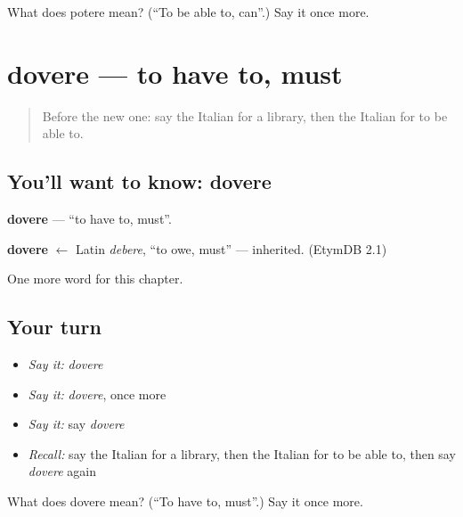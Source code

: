 \begin{tcolorbox}[breakable,colback=teal!4,colframe=teal!35!black,title={Before you move on}]
What does potere mean? (\textquotedblleft{}To be able to, can\textquotedblright{}.) Say it once more.
\end{tcolorbox}
\section[dovere]{dovere — to have to, must}

\label{lesson:IT-C85-dovere}



\begin{quote}
Before the new one: say the Italian for a library, then the Italian for to be able to.
\end{quote}

\subsection*{You'll want to know: dovere}
\textbf{dovere} — \textquotedblleft{}to have to, must\textquotedblright{}.

\begin{cousinweb}
\textbf{dovere} $\leftarrow$ Latin \emph{debere}, \textquotedblleft{}to owe, must\textquotedblright{} — inherited. (EtymDB 2.1)
\end{cousinweb}

\begin{grammarlens}[title={What you've built}]
One more word for this chapter.
\end{grammarlens}

\subsection*{Your turn}
\begin{itemize}
\raggedright
  \item \emph{Say it:} \emph{dovere}
  \item \emph{Say it:} \emph{dovere}, once more
  \item \emph{Say it:} say \emph{dovere}
  \item \emph{Recall:} say the Italian for a library, then the Italian for to be able to, then say \emph{dovere} again
\end{itemize}

\begin{tcolorbox}[breakable,colback=teal!4,colframe=teal!35!black,title={Before you move on}]
What does dovere mean? (\textquotedblleft{}To have to, must\textquotedblright{}.) Say it once more.
\end{tcolorbox}
